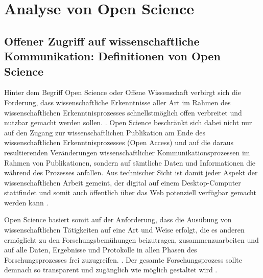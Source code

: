 \section{Analyse von Open Science}

\subsection{Offener Zugriff auf wissenschaftliche Kommunikation: Definitionen von Open Science}

Hinter dem Begriff Open Science oder Offene Wissenschaft verbirgt sich die Forderung, dass wissenschaftliche Erkenntnisse aller Art im Rahmen des wissenschaftlichen Erkenntnisprozesses schnellstmöglich offen verbreitet und nutzbar gemacht werden sollen. \cite{https://lists.okfn.org/pipermail/open-science/2011-July/000907.html}. Open Science beschränkt sich dabei nicht nur auf den Zugang zur wissenschaftlichen Publikation am Ende des wissenschaftlichen Erkenntnisprozesses (Open Access) und auf die daraus resultierenden Veränderungen wissenschaftlicher Kommunikationsprozessen im Rahmen von Publikationen, sondern auf sämtliche Daten und Informationen die während des Prozesses anfallen. Aus technischer Sicht ist damit jeder Aspekt der wissenschaftlichen Arbeit gemeint, der digital auf einem Desktop-Computer stattfindet und somit auch öffentlich über das Web potenziell verfügbar gemacht werden kann \cite{mietchen2012wissenschaft}.

Open Science basiert somit auf der Anforderung, dass die Ausübung von wissenschaftlichen Tätigkeiten auf eine Art und Weise erfolgt, die es anderen ermöglicht zu den Forschungsbemühungen beizutragen, zusammenzuarbeiten und auf alle Daten, Ergebnisse und Protokolle in allen Phasen des Forschungsprozesses frei zuzugreifen. \cite{http://www.rin.ac.uk/our-work/data-management-and-curation/open-science-case-studies}. Der gesamte Forschungsprozess sollte demnach so transparent und zugänglich wie möglich gestaltet wird \cite{Scheliga_2014}.

